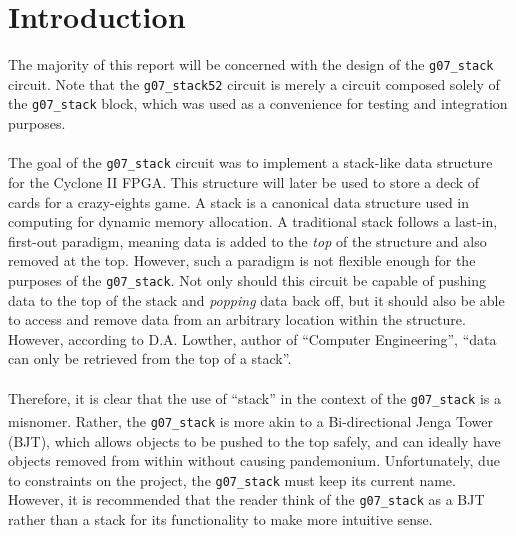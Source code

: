 \documentclass[12pt]{report}
\begin{document}
\chapter*{Introduction}
The majority of this report will be concerned with the design of the \texttt{g07\_stack} circuit. Note
that the \texttt{g07\_stack52} circuit is merely a circuit composed solely of the
\texttt{g07\_stack} block, which was used as a convenience for testing and integration purposes.\\\\
The goal of the \texttt{g07\_stack} circuit was to implement a stack-like data structure for the
Cyclone II FPGA. This structure will later be used to store a deck of cards for a crazy-eights game.
A stack is a canonical data structure used in computing for dynamic memory allocation. A traditional
stack follows a last-in, first-out paradigm, meaning data is added to the \textit{top} of the
structure and also
removed at the top. However, such a paradigm is not flexible enough for the purposes of the
\texttt{g07\_stack}. Not only should this circuit be capable of pushing data to the top of the stack
and \textit{popping} data back off, but it should also be able to access and remove data from an
arbitrary location
within the structure. However, according to D.A. Lowther, author of ``Computer Engineering'', ``data can only
be retrieved from the top of a stack''\cite{lowther}. \\\\
Therefore, it is clear that the use of ``stack'' in the
context of the \texttt{g07\_stack} is a misnomer. Rather, the \texttt{g07\_stack} is more akin to a
Bi-directional Jenga\textsuperscript{\textregistered} Tower (BJT), which allows objects to be pushed
to the top safely,
and can ideally have objects removed from within without causing pandemonium. Unfortunately, due to
constraints on the project, the \texttt{g07\_stack} must keep its current name. However, it is
recommended that the reader think of the \texttt{g07\_stack} as a BJT rather than a stack for its
functionality to make more intuitive sense.
\end{document}
